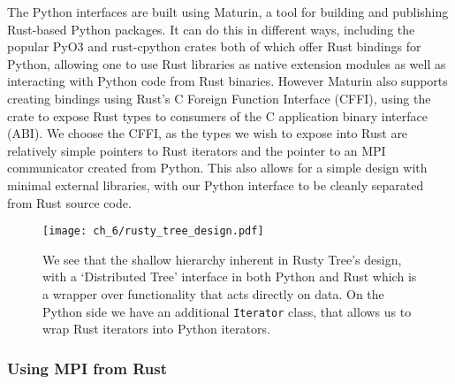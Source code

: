 The Python interfaces are built using Maturin, a tool for building and publishing Rust-based Python packages. It can do this in different ways, including the popular PyO3 \cite{pyo32022github} and rust-cpython \cite{rustcpython2022github} crates both of which offer Rust bindings for Python, allowing one to use Rust libraries as native extension modules as well as interacting with Python code from Rust binaries. However Maturin also supports creating bindings using Rust's C Foreign Function Interface (CFFI), using the  crate to expose Rust types to consumers of the C application binary interface (ABI). We choose the CFFI, as the types we wish to expose into Rust are relatively simple pointers to Rust iterators and the pointer to an MPI communicator created from Python. This also allows for a simple design with minimal external libraries, with our Python interface to be cleanly separated from Rust source code.



\begin{figure}
    \centerline{\texttt{[image: ch\_6/rusty\_tree\_design.pdf]}}
    \caption{We see that the shallow hierarchy inherent in Rusty Tree's design, with a `Distributed Tree' interface in both Python and Rust which is a wrapper over functionality that acts directly on data. On the Python side we have an additional \texttt{Iterator} class, that allows us to wrap Rust iterators into Python iterators.}
    \label{fig:ch_6:design}
\end{figure}

\subsubsection*{Using MPI from Rust}

